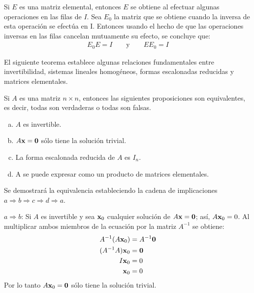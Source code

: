 \documentclass[a4paper,12pt]{article}
\begin{document}
\demo Si $E$ es una matriz elemental, entonces $E$ se obtiene al efectuar
algunas operaciones en las filas de $I$. Sea $E_0$ la matriz que se obtiene
cuando la inversa de esta operación se efectúa en I. Entonces usando el hecho
de que las operaciones inversas en las filas cancelan mutuamente su efecto, se
concluye que:
\begin{align*}
  E_0E=I \qquad \mbox{y} \qquad EE_0=I
\end{align*}

El siguiente teorema establece algunas relaciones fundamentales entre
invertibilidad, sistemas lineales homogéneos, formas escalonadas reducidas y
matrices elementales.

\begin{theorem}
  Si $A$ es una matriz $n\times n$, entonces las siguientes proposiciones son
  equivalentes, es decir, todas son verdaderas o todas son falsas.
  \begin{enumerate}[(a)]
    \item $A$ es invertible.
    \item $A\textbf{x}=\textbf{0}$ sólo tiene la solución trivial.
    \item La forma escalonada reducida de $A$ es $I_n$.
    \item A se puede expresar como un producto de matrices elementales.
  \end{enumerate}
  \label{theo:relacfund}
\end{theorem}

\demo Se demostrará la equivalencia estableciendo la cadena de implicaciones
$a\Rightarrow b\Rightarrow c\Rightarrow d\Rightarrow a$.

$a\Rightarrow b$: Si $A$ es invertible y sea  $\textbf{x}_0$ cualquier solución de
$A\textbf{x}=\textbf{0}$; así, $A\textbf{x}_0=0$. Al multiplicar ambos miembros de la
ecuación por la matriz $A^{-1}$ se obtiene:
\begin{align*}
  A^{-1}(A\textbf{x}_0) &= A^{-1}\textbf{0} \\
  (A^{-1}A)\textbf{x}_0 &= \textbf{0} \\
          I\textbf{x}_0 &= 0 \\
           \textbf{x}_0 &= 0
\end{align*}
Por lo tanto $A\textbf{x}_0=\textbf{0}$ sólo tiene la solución trivial.
\end{document}

